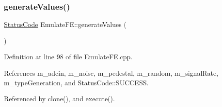 \mbox{\label{classEmulateFE_ae557d3569b9285a871c502b93ba20494}} 
\subsubsection{\texorpdfstring{generate\+Values()}{generateValues()}}
{\footnotesize\ttfamily \hyperlink{classStatusCode}{Status\+Code} Emulate\+F\+E\+::generate\+Values (\begin{DoxyParamCaption}{ }\end{DoxyParamCaption})\hspace{0.3cm}{\ttfamily [protected]}}



Definition at line 98 of file Emulate\+F\+E.\+cpp.



References m\+\_\+adcin, m\+\_\+noise, m\+\_\+pedestal, m\+\_\+random, m\+\_\+signal\+Rate, m\+\_\+type\+Generation, and Status\+Code\+::\+S\+U\+C\+C\+E\+SS.



Referenced by clone(), and execute().



